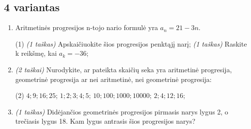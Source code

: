 \documentclass[a4paper]{article}
\begin{document}
\subsection*{4 variantas}

\begin{enumerate}
      \item Aritmetinės progresijos n-tojo nario formulė yra $a_{n}=21-3n$.

            \begin{tasks}[item-format={\normalfont}, after-item-skip=2mm](1)
                  \task \textit{(1 taškas)} Apskaičiuokite šios progresijos
                  penktąjį
                  narį;
                  \task \textit{(1 taškas)} Raskite k reikšmę, kai $a_k=-36$;
            \end{tasks}

      \item \textit{(2 taškai)} Nurodykite, ar pateikta skaičių seka yra
            aritmetinė progresija, geometrinė progresija ar nei aritmetinė, nei
            geometrinė progresija:
            \begin{tasks}[item-format={\normalfont}, after-item-skip=2mm](2)
                  \task $4; 9; 16; 25$;
                  \task $1;2;3;4;5$;
                  \task $10; 100; 1000; 10000$;
                  \task $2;4;12;16$;
            \end{tasks}

      \item \textit{(1 taškas)} Didėjančios geometrinės progresijos pirmasis
            narys lygus 2, o trečiasis lygus 18. Kam lygus antrasis šios
            progresijos narys?


\end{enumerate}
\end{document}
